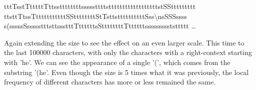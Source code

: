\documentclass{article}
\begin{document}
\begin{center}
tttTsstTtttttTttss\textvisiblespace t\textvisiblespace tt\textvisiblespace tttttss\textvisiblespace ssstttts\textvisiblespace ttttttttt\textvisiblespace tttttttttstSS\textvisiblespace ttt\textvisiblespace tttttt
tt\textvisiblespace \textvisiblespace \textvisiblespace \textvisiblespace sttTtss\textvisiblespace TtttttttttttSSttttttttStTsttstttttt\textvisiblespace tt\textvisiblespace ttSss\textbackslash\textvisiblespace ns\textvisiblespace SSS\textvisiblespace \textvisiblespace s\textvisiblespace \textvisiblespace s\textvisiblespace ss
\textvisiblespace \textvisiblespace 
s(\textvisiblespace \textvisiblespace \textvisiblespace \textvisiblespace \textvisiblespace sssssS\textvisiblespace s\textvisiblespace \textvisiblespace s\textvisiblespace ssstttst\textvisiblespace t\textvisiblespace sss\textvisiblespace tttTttttttsSttttttttTttttttsssss\textvisiblespace sss\textvisiblespace ststtttt 
\dots
\end{center}
Again extending the size to see the effect on an even larger scale. This time to the last 100000 characters, with only the characters with a right-context starting with 'he\textvisiblespace'. We can see the appearance of a single '(', which comes from the substring '(he\textvisiblespace'. Even though the size is 5 times what it was previously, the local frequency of different characters has more or less remained the same.
\end{document}
